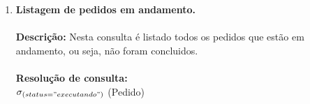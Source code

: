 \documentclass[12pt, onecolumn, titlepage]{article}
\begin{document}
\begin{enumerate}
\item \textbf{Listagem de pedidos em andamento.} \\\\
\qquad \textbf{Descrição:} Nesta consulta é listado todos os pedidos que estão em andamento, ou seja, não foram concluidos.\\\\
\qquad \textbf{Resolução de consulta:}\\
\qquad $\sigma _{(status="executando")}$ (Pedido) \\

\end{enumerate}
\end{document}
